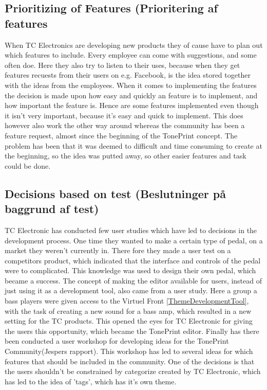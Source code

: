 \subsection*{Prioritizing of Features (Prioritering af features}
\label{ThemePrioritizingOfFeatures}
When TC Electronics are developing new products they of cause have to plan out which features to include. Every employee can come with suggestions, and some often doe. Here they also try to listen to their uses, because when they get features recuests from their users on e.g. Facebook, is the idea stored together with the ideas from the employees. When it comes to implementing the features the decision is made upon how easy and quickly an feature is to implement, and how important the feature is. Hence are some features implemented even though it isn't very important, because it's easy and quick to implement. This does however also work the other way around whereas the community has been a feature request, almost since the beginning of the TonePrint concept. The problem has been that it was deemed to difficult and time consuming to create at the beginning, so the idea was putted away, so other easier features and task could be done.

\subsection*{Decisions based on test (Beslutninger på baggrund af test)}
 \label{ThemeDecisionsBasedOnTest}
 TC Electronic has conducted few user studies which have led to decisions in the development process. One time they wanted to make a certain type of pedal, on a market they weren't currently in. There fore they made a user test on a competitors product, which indicated that the interface and controls of the pedal were to complicated. This knowledge was used to design their own pedal, which became a success. The concept of making the editor available for users, instead of just using it as a development tool, also came from a user study. Here a group a bass players were given access to the Virtuel Front \autoref{ThemeDevelopmentTool}, with the task of creating a new sound for a bass amp, which resulted in a new setting for the TC products. This opened the eyes for TC Electronic for giving the users this opportunity, which became the TonePrint editor. Finally has there been conducted a user workshop for developing ideas for the TonePrint Community(Jespers rapport). This workshop has led to several ideas for which features that should be included in the community. One of the decisions is that the users shouldn't be constrained by categorize created by TC Electronic, which has led to the idea of 'tags', which has it's own theme.
 

